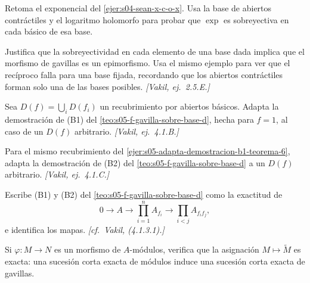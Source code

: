 \begin{ejer}
\label{ejer:s05-cosechando-sembrador-sesion-4}
Retoma el exponencial del \cref{ejer:s04-sean-x-c-o-x}. Usa la base de abiertos contráctiles y el logaritmo holomorfo para probar que $\exp$ es sobreyectiva en cada básico de esa base.

Justifica que la sobreyectividad en cada elemento de una base dada implica que el morfismo de gavillas es un epimorfismo. Usa el mismo ejemplo para ver que el recíproco falla para una base fijada, recordando que los abiertos contráctiles forman solo una de las bases posibles. \emph{[Vakil, ej.~2.5.E.]}
\end{ejer}
\begin{ejer}
\label{ejer:s05-adapta-demostracion-b1-teorema-6}
Sea $D(f)=\bigcup_i D(f_i)$ un recubrimiento por abiertos básicos. Adapta la demostración de (B1) del \cref{teo:s05-f-gavilla-sobre-base-d}, hecha para $f=1$, al caso de un $D(f)$ arbitrario. \emph{[Vakil, ej.~4.1.B.]}
\end{ejer}
\begin{ejer}
\label{ejer:s05-adapta-demostracion-b2-teorema-6}
Para el mismo recubrimiento del \cref{ejer:s05-adapta-demostracion-b1-teorema-6}, adapta la demostración de (B2) del \cref{teo:s05-f-gavilla-sobre-base-d} a un $D(f)$ arbitrario. \emph{[Vakil, ej.~4.1.C.]}
\end{ejer}
\begin{ejer}
\label{ejer:s05-escribe-b1-b2-teorema-6}
Escribe (B1) y (B2) del \cref{teo:s05-f-gavilla-sobre-base-d} como la exactitud de
\[
0\longrightarrow A\longrightarrow\prod_{i=1}^n A_{f_i}\longrightarrow\prod_{i<j}A_{f_if_j},
\]
e identifica los mapas. \emph{[cf.~Vakil, (4.1.3.1).]}
\end{ejer}
\begin{ejer}
\label{ejer:s05-sembrador-cosecha-estudiar-gavillas-cuasicoherentes}
Si $\varphi\colon M\to N$ es un morfismo de $A$-módulos, verifica que la asignación $M\mapsto\widetilde M$ es exacta: una sucesión corta exacta de módulos induce una sucesión corta exacta de gavillas.
\end{ejer}
